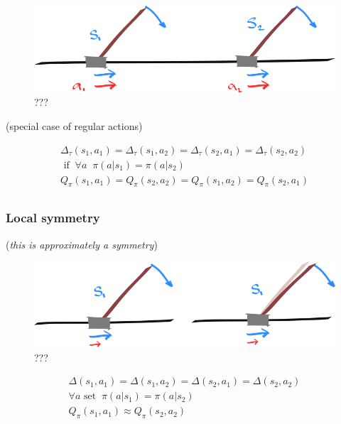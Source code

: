 \begin{figure}
\centering
\includegraphics[width=1\textwidth,height=0.25\textheight]{../../pictures/drawings/cart-pole-translation.png}
\caption{???}
\end{figure}

(special case of regular actions)


\begin{align}
\Delta_{\tau}(s_1, a_1) = \Delta_{\tau}(s_1, a_2) = \Delta_{\tau}(s_2, a_1) = \Delta_{\tau}(s_2, a_2) \\
 \text{ if} \;\;\forall a\;\;\pi(a | s_1) = \pi(a| s_2) \\
Q_\pi(s_1, a_1) = Q_\pi(s_2, a_2)= Q_\pi(s_1, a_2) = Q_\pi(s_2, a_1) \\
\end{align}


\hypertarget{local-symmetry}{%
\subsubsection{Local symmetry}\label{local-symmetry}}

(\emph{this is approximately a symmetry})

\begin{figure}
\centering
\includegraphics[width=1\textwidth,height=0.25\textheight]{../../pictures/drawings/cart-pole-approx.png}
\caption{???}
\end{figure}

\begin{align}
\Delta(s_1, a_1) = \Delta(s_1, a_2) = \Delta(s_2, a_1) = \Delta(s_2, a_2) \\
\forall a \text{ set}\;\;\pi(a | s_1) = \pi(a| s_2) \\
Q_\pi(s_1, a_1) \approx Q_\pi(s_2, a_2)  \\
\end{align}

